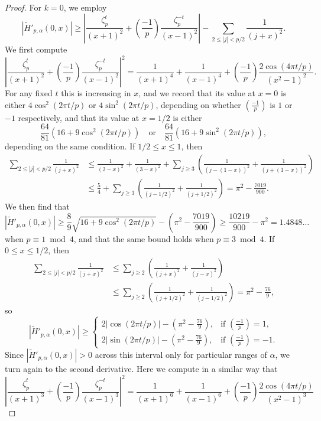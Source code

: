 \documentclass[reqno]{amsart}
\numberwithin{equation}{section}
\numberwithin{table}{section}
\numberwithin{figure}{section}
\newcommand\thinsp{5pt}
\newcommand{\leg}[2]{\left(\frac{#1}{#2}\right)}
\newcommand{\abs}[1]{\left\lvert#1\right\rvert}
\begin{document}
\begin{proof}
For $k=0$, we employ
\[
\abs{\widetilde{H}'_{p,\alpha}(0,x)}
\geq
 \abs{\frac{\zeta_p^t}{(x+1)^2} + \leg{-1}{p}\frac{\zeta_p^{-t}}{(x-1)^2}} - \sum_{2\leq \abs{j}<p/2} \frac{1}{(j+x)^2}.
\]
We first compute
\[
\abs{\frac{\zeta_p^t}{(x+1)^2} + \leg{-1}{p}\frac{\zeta_p^{-t}}{(x-1)^2}}^2 = \frac{1}{(x+1)^4} + \frac{1}{(x-1)^4} + \leg{-1}{p}\frac{2\cos(4\pi t/p)}{(x^2-1)^2}.
\]
For any fixed $t$ this is increasing in $x$, and we record that its value at $x=0$ is either $4\cos^2(2\pi t/p)$ or $4\sin^2(2\pi t/p)$, depending on whether $\leg{-1}{p}$ is $1$ or $-1$ respectively, and that its value at $x=1/2$ is either
\[
\frac{64}{81}\left(16 + 9\cos^2(2\pi t/p)\right)
\quad \mathrm{or} \quad
\frac{64}{81}\left(16 + 9\sin^2(2\pi t/p)\right),
\]
depending on the same condition.
If $1/2\leq x\leq 1$, then
\begin{align*}
\sum_{2\leq \abs{j}<p/2} \frac{1}{(j+x)^2}
&\leq
\frac{1}{(2-x)^2} + \frac{1}{(3-x)^2} + \sum_{j\geq3} \left(\frac{1}{(j-(1-x))^2} + \frac{1}{(j+(1-x))^2}\right)\\
&\leq
\frac{5}{4} + \sum_{j\geq3} \left(\frac{1}{(j-1/2)^2} + \frac{1}{(j+1/2)^2}\right)
=
\pi^2 - \frac{7019}{900}.
\end{align*}
We then find that
\[
\abs{\widetilde{H}'_{p,\alpha}(0,x)}
\geq
\frac{8}{9}\sqrt{16 + 9\cos^2(2\pi t/p)} - \left(\pi^2 - \frac{7019}{900}\right)
\geq \frac{10219}{900}-\pi ^2 = 1.4848\ldots
\]
when $p\equiv1\bmod4$, and that the same bound holds when $p\equiv3\bmod4$.
If $0\leq x\leq 1/2$, then
\begin{align*}
\sum_{2\leq \abs{j}<p/2} \frac{1}{(j+x)^2}
&\leq
\sum_{j\geq 2} \left(\frac{1}{(j+x)^2} +  \frac{1}{(j-x)^2}\right)\\
&\leq
\sum_{j\geq 2}\left( \frac{1}{(j+1/2)^2} +  \frac{1}{(j-1/2)^2}\right)
= \pi^2 - \frac{76}{9},
\end{align*}
so
\[
\abs{\widetilde{H}'_{p,\alpha}(0,x)}
\geq
\begin{cases}
2\abs{\cos(2\pi t/p)} - \left(\pi^2 - \frac{76}{9}\right), & \textrm{if $\leg{-1}{p}=1$},\\[\thinsp]
2\abs{\sin(2\pi t/p)} - \left(\pi^2 - \frac{76}{9}\right), & \textrm{if $\leg{-1}{p}=-1$}.
\end{cases}
\]
Since $|\widetilde{H}'_{p,\alpha}(0,x)|>0$ across this interval only for particular ranges of $\alpha$, we turn again to the second derivative.
Here we compute in a similar way that
\[
\abs{\frac{\zeta_p^t}{(x+1)^3} + \leg{-1}{p}\frac{\zeta_p^{-t}}{(x-1)^3}}^2 = \frac{1}{(x+1)^6} + \frac{1}{(x-1)^6} + \leg{-1}{p}\frac{2\cos(4\pi t/p)}{(x^2-1)^3}
\]
\end{proof}
\end{document}
